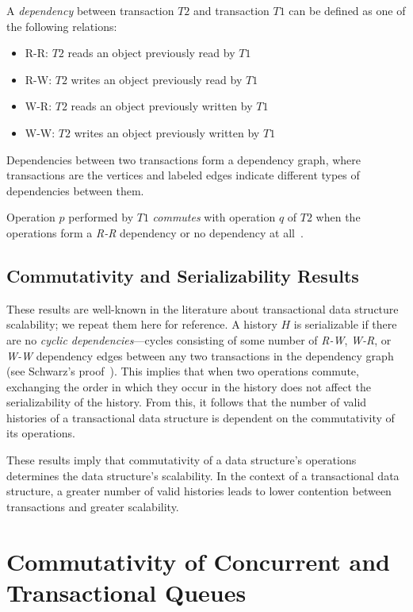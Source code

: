 \begin{defn}
    A \emph{dependency} between transaction $T2$ and transaction $T1$ can be defined as one of the following relations:
    \begin{itemize}
        \item R-R: $T2$ reads an object previously read by $T1$
        \item R-W: $T2$ writes an object previously read by $T1$
        \item W-R: $T2$ reads an object previously written by $T1$
        \item W-W: $T2$ writes an object previously written by $T1$
    \end{itemize}
    Dependencies between two transactions form a dependency graph, where transactions are the vertices and labeled edges indicate different types of dependencies between them.
\end{defn}

\begin{defn}
    Operation $p$ performed by $T1$ \emph{commutes} with operation $q$ of $T2$ when the operations form a \emph{R-R} dependency or no dependency at all~\cite{weihl}.
\end{defn}

\subsection{Commutativity and Serializability Results}

These results are well-known in the literature about transactional data structure scalability; we repeat them here for reference.
A history $H$ is serializable if there are no \emph{cyclic dependencies}---cycles consisting of some number of \emph{R-W}, \emph{W-R}, or \emph{W-W} dependency edges between any two transactions in the dependency graph (see Schwarz's proof~\cite{schwarz}). This implies that when two operations commute, exchanging the order in which they occur in the history does not affect the serializability of the history. From this, it follows that the number of valid histories of a transactional data structure is dependent on the commutativity of its operations.

These results imply that commutativity of a data structure's operations determines the data structure's scalability. In the context of a transactional data structure, a greater number of valid histories leads to lower contention between transactions and greater scalability. 

\section{Commutativity of Concurrent and Transactional Queues}

